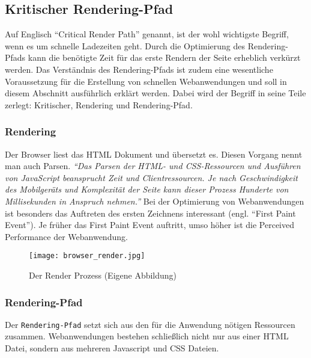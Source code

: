 	\pagebreak

	\subsection{Kritischer Rendering-Pfad} %
	\label{sub:critical_render_path}
		Auf Englisch "`Critical Render Path"' genannt, ist der wohl wichtigste Begriff, wenn es um schnelle Ladezeiten geht. Durch die Optimierung des Rendering-Pfads kann die benötigte Zeit für das erste Rendern der Seite erheblich verkürzt werden. Das Verständnis des Rendering-Pfads ist zudem eine wesentliche Voraussetzung für die Erstellung von schnellen Webanwendungen und soll in diesem Abschnitt ausführlich erklärt werden. Dabei wird der Begriff in seine Teile zerlegt: Kritischer, Rendering und Rendering-Pfad.

		\subsubsection{Rendering} %
		\label{ssub:rendering}
			Der Browser liest das HTML Dokument und übersetzt es. Diesen Vorgang nennt man auch Parsen. \textit{"`Das Parsen der HTML- und CSS-Ressourcen und Ausführen von JavaScript beansprucht Zeit und Clientressourcen. Je nach Geschwindigkeit des Mobilgeräts und Komplexität der Seite kann dieser Prozess Hunderte von Millisekunden in Anspruch nehmen."'}\autocite{google14} Bei der Optimierung von Webanwendungen ist besonders das Auftreten des ersten Zeichnens interessant (engl. "`First Paint Event"'). Je früher das First Paint Event auftritt, umso höher ist die Perceived Performance der Webanwendung.

			\begin{figure}[htbp]
				\begin{center}
					\texttt{[image: browser\_render.jpg]}
					\caption{Der Render Prozess (Eigene Abbildung)}
					\label{fig:browser_render}
				\end{center}
			\end{figure}



		\subsubsection{Rendering-Pfad} %
		\label{ssub:rendering_pfad}

			Der \texttt{Rendering-Pfad} setzt sich aus den für die Anwendung nötigen Ressourcen zusammen. Webanwendungen bestehen schließlich nicht nur aus einer HTML Datei, sondern aus mehreren Javascript und CSS Dateien.

